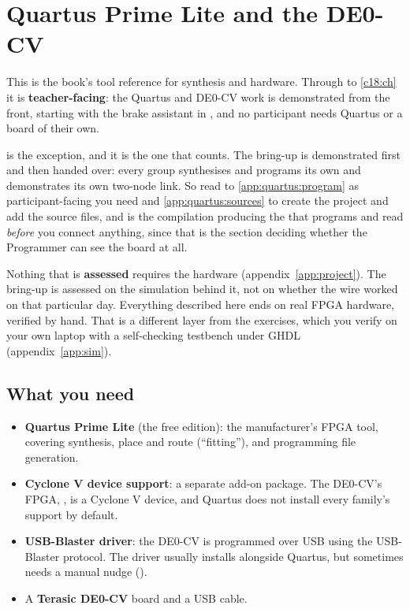 
\chapter{Quartus Prime Lite and the DE0-CV}
\label{app:quartus}

This is the book's tool reference for synthesis and hardware. Through  to
\ref{c18:ch} it is \textbf{teacher-facing}: the Quartus and DE0-CV work is demonstrated from the
front, starting with the brake assistant in , and no participant needs Quartus or a
board of their own.

\begin{aside}
 is the exception, and it is the one that counts. The bring-up is demonstrated first
and then handed over: every group synthesises and programs its own  and
demonstrates its own two-node link. So read  to \ref{app:quartus:program}
as participant-facing \textemdash{} you need  and
\ref{app:quartus:sources} to create the project and add the source files, and
 is the compilation producing the  that
 programs \textemdash{} and read  \emph{before}
you connect anything, since that is the section deciding whether the Programmer can see the board at
all.
\end{aside}

Nothing that is \textbf{assessed} requires the hardware (appendix~\ref{app:project}). The bring-up is
assessed on the simulation behind it, not on whether the wire worked on that particular day.
Everything described here ends on real FPGA hardware, verified by hand. That is a different layer from
the exercises, which you verify on your own laptop with a self-checking testbench under GHDL
(appendix~\ref{app:sim}).

\section{What you need}
\label{app:quartus:need}

\begin{itemize}
  \item \textbf{Quartus Prime Lite} (the free edition): the manufacturer's FPGA tool, covering
    synthesis, place and route (``fitting''), and programming file generation.
  \item \textbf{Cyclone V device support}: a separate add-on package. The DE0-CV's FPGA,
    , is a Cyclone V device, and Quartus does not install every family's support
    by default.
  \item \textbf{USB-Blaster driver}: the DE0-CV is programmed over USB using the USB-Blaster
    protocol. The driver usually installs alongside Quartus, but sometimes needs a manual nudge
    ().
  \item A \textbf{Terasic DE0-CV} board and a USB cable.
\end{itemize}

